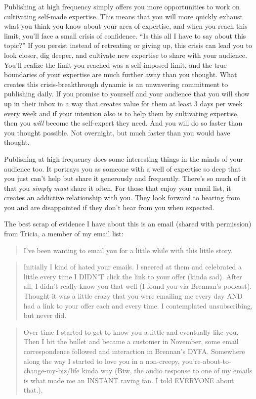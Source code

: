Publishing at high frequency simply offers you more opportunities to work on cultivating self-made expertise. This means that you will more quickly exhaust what you think you know about your area of expertise, and when you reach this limit, you'll face a small crisis of confidence. ``Is this all I have to say about this topic?'' If you persist instead of retreating or giving up, this crisis can lead you to look closer, dig deeper, and cultivate new expertise to share with your audience. You'll realize the limit you reached was a self-imposed limit, and the true boundaries of your expertise are much further away than you thought. What creates this crisis-breakthrough dynamic is an unwavering commitment to publishing daily. If you promise to yourself and your audience that you will show up in their inbox in a way that creates value for them at least 3 days per week every week and if your intention also is to help them by cultivating expertise, then you \emph{will} become the self-expert they need. And you will do so faster than you thought possible. Not overnight, but much faster than you would have thought.

Publishing at high frequency does some interesting things in the minds of your audience too. It portrays you as someone with a well of expertise so deep that you just can't help but share it generously and frequently. There's so much of it that you \emph{simply must} share it often. For those that enjoy your email list, it creates an addictive relationship with you. They look forward to hearing from you and are disappointed if they don't hear from you when expected.

The best scrap of evidence I have about this is an email (shared with permission) from Tricia, a member of my email list:

\begin{quote}
I've been wanting to email you for a little while with this little story.
\end{quote}

\begin{quote}
Initially I kind of hated your emails. I sneered at them and celebrated a little every time I DIDN'T click the link to your offer (kinda sad).  After all, I didn't really know you that well (I found you via Brennan's podcast).  Thought it was a little crazy that you were emailing me every day AND had a link to your offer each and every time.  I contemplated unsubscribing, but never did.
\end{quote}

\begin{quote}
Over time I started to get to know you a little and eventually like you.  Then I bit the bullet and became a customer in November, some email correspondence followed and interaction in Brennan's DYFA.  Somewhere along the way I started to love you in a non-creepy, you're-about-to-change-my-biz/life kinda way (Btw, the audio response to one of my emails is what made me an INSTANT raving fan.  I told EVERYONE about that.).
\end{quote}

